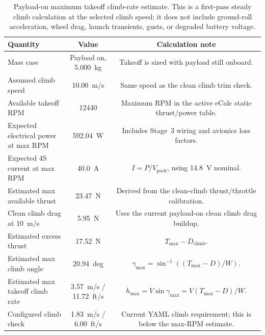 \documentclass[11pt]{article}
\begin{document}
\begin{table}[H]
\centering
\small
\begin{tabular}{lcc}
\toprule
Quantity & Value & Calculation note \\
\midrule
Mass case & Payload on, \SI{5.000}{kg} & Takeoff is sized with payload still onboard. \\
Assumed climb speed & \SI{10.00}{m/s} & Same speed as the clean climb trim check. \\
Available takeoff RPM & \num{12440} & Maximum RPM in the active eCalc static thrust/power table. \\
Expected electrical power at max RPM & \SI{592.04}{W} & Includes Stage~3 wiring and avionics loss factors. \\
Expected 4S current at max RPM & \SI{40.0}{A} & \(I=P/V_{\mathrm{pack}}\), using \SI{14.8}{V} nominal. \\
Estimated max available thrust & \SI{23.47}{N} & Derived from the clean-climb thrust/throttle calibration. \\
Clean climb drag at \SI{10}{m/s} & \SI{5.95}{N} & Uses the current payload-on clean climb drag buildup. \\
Estimated excess thrust & \SI{17.52}{N} & \(T_{\max}-D_{\mathrm{climb}}\). \\
Estimated max climb angle & \SI{20.94}{deg} & \(\gamma_{\max}=\sin^{-1}\left((T_{\max}-D)/W\right)\). \\
Estimated max takeoff climb rate & \SI{3.57}{m/s} / \SI{11.72}{ft/s} & \(\dot{h}_{\max}=V\sin\gamma_{\max}=V(T_{\max}-D)/W\). \\
Configured climb check & \SI{1.83}{m/s} / \SI{6.00}{ft/s} & Current YAML climb requirement; this is below the max-RPM estimate. \\
\bottomrule
\end{tabular}
\caption{Payload-on maximum takeoff climb-rate estimate. This is a first-pass steady climb calculation at the selected climb speed; it does not include ground-roll acceleration, wheel drag, launch transients, gusts, or degraded battery voltage.}
\label{tab:stage3-takeoff-max-climb}
\end{table}
\end{document}
